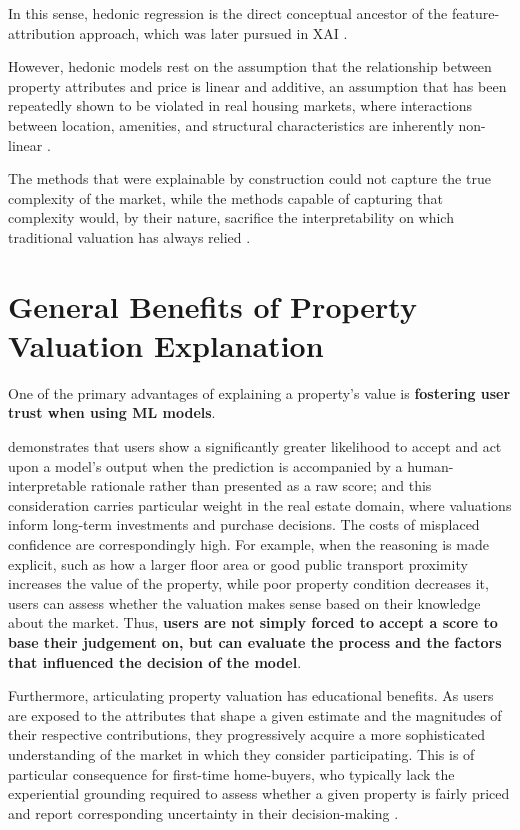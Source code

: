 In this sense, hedonic regression is the direct conceptual ancestor of the feature-attribution approach, which was later pursued in XAI \parencite{Iban2022}. 

However, hedonic models rest on the assumption that the relationship between property attributes and price is linear and additive, an assumption that has been repeatedly shown to be violated in real housing markets, where interactions between location, amenities, and structural characteristics are inherently non-linear \parencite{Wing2003}.

The methods that were explainable by construction could not capture the true complexity of the market, while the methods capable of capturing that complexity would, by their nature, sacrifice the interpretability on which traditional valuation has always relied \parencite{Lorenz2023}.


\section{General Benefits of Property Valuation Explanation}
\label{se:GeneralBenfits}

One of the primary advantages of explaining a property's value is \textbf{fostering user trust when using ML models}.

\textcite{Ribeiro2016} demonstrates that users show a significantly greater likelihood to accept and act upon a model's output when the prediction is accompanied by a human-interpretable rationale rather than presented as a raw score; and this consideration carries particular weight in the real estate domain, where valuations inform long-term investments and purchase decisions. The costs of misplaced confidence are correspondingly high. For example, when the reasoning is made explicit, such as how a larger floor area or good public transport proximity increases the value of the property, while poor property condition decreases it, users can assess whether the valuation makes sense based on their knowledge about the market. Thus, \textbf{users are not simply forced to accept a score to base their judgement on, but can evaluate the process and the factors that influenced the decision of the model}.

Furthermore, articulating property valuation has educational benefits. As users are exposed to the attributes that shape a given estimate and the magnitudes of their respective contributions, they progressively acquire a more sophisticated understanding of the market in which they consider participating. This is of particular consequence for first-time home-buyers, who typically lack the experiential grounding required to assess whether a given property is fairly priced and report corresponding uncertainty in their decision-making \parencite{Reid2013}. 

